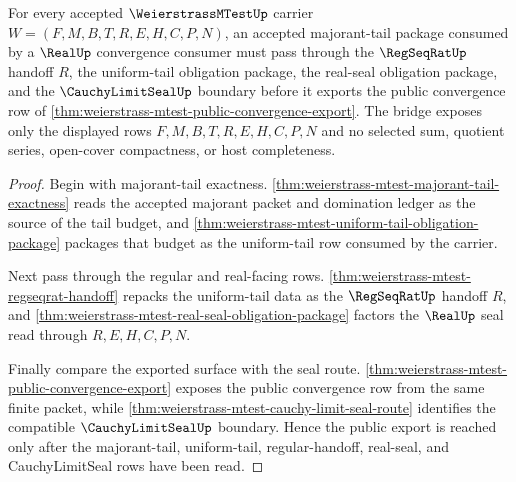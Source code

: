 \begin{theorem}
\label{thm:weierstrass-mtest-bridge-majorant-seal}
For every accepted $\WeierstrassMTestUp$ carrier $W=(F,M,B,T,R,E,H,C,P,N)$, an accepted majorant-tail package consumed by a $\RealUp$ convergence consumer must pass through the $\RegSeqRatUp$ handoff $R$, the uniform-tail obligation package, the real-seal obligation package, and the $\CauchyLimitSealUp$ boundary before it exports the public convergence row of \autoref{thm:weierstrass-mtest-public-convergence-export}. The bridge exposes only the displayed rows $F,M,B,T,R,E,H,C,P,N$ and no selected sum, quotient series, open-cover compactness, or host completeness.
\end{theorem}
\begin{proof}
Begin with majorant-tail exactness. \autoref{thm:weierstrass-mtest-majorant-tail-exactness} reads the accepted majorant packet and domination ledger as the source of the tail budget, and \autoref{thm:weierstrass-mtest-uniform-tail-obligation-package} packages that budget as the uniform-tail row consumed by the carrier.

Next pass through the regular and real-facing rows. \autoref{thm:weierstrass-mtest-regseqrat-handoff} repacks the uniform-tail data as the $\RegSeqRatUp$ handoff $R$, and \autoref{thm:weierstrass-mtest-real-seal-obligation-package} factors the $\RealUp$ seal read through $R,E,H,C,P,N$.

Finally compare the exported surface with the seal route. \autoref{thm:weierstrass-mtest-public-convergence-export} exposes the public convergence row from the same finite packet, while \autoref{thm:weierstrass-mtest-cauchy-limit-seal-route} identifies the compatible $\CauchyLimitSealUp$ boundary. Hence the public export is reached only after the majorant-tail, uniform-tail, regular-handoff, real-seal, and CauchyLimitSeal rows have been read.
\end{proof}

